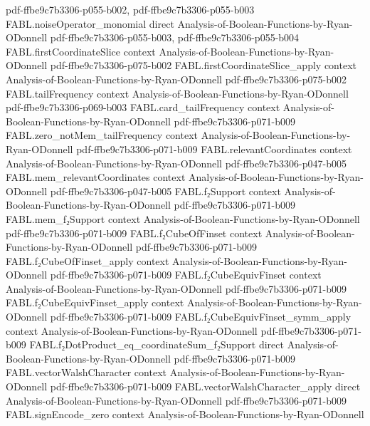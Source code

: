 \begin{theorem}
  {pdf-ffbe9c7b3306-p055-b002,
    pdf-ffbe9c7b3306-p055-b003}
\proofstep
  {FABL.noiseOperator_monomial}
  {direct}
  {Analysis-of-Boolean-Functions-by-Ryan-ODonnell}
  {pdf-ffbe9c7b3306-p055-b003,
    pdf-ffbe9c7b3306-p055-b004}
\proofstep
  {FABL.firstCoordinateSlice}
  {context}
  {Analysis-of-Boolean-Functions-by-Ryan-ODonnell}
  {pdf-ffbe9c7b3306-p075-b002}
\proofstep
  {FABL.firstCoordinateSlice_apply}
  {context}
  {Analysis-of-Boolean-Functions-by-Ryan-ODonnell}
  {pdf-ffbe9c7b3306-p075-b002}
\proofstep
  {FABL.tailFrequency}
  {context}
  {Analysis-of-Boolean-Functions-by-Ryan-ODonnell}
  {pdf-ffbe9c7b3306-p069-b003}
\proofstep
  {FABL.card_tailFrequency}
  {context}
  {Analysis-of-Boolean-Functions-by-Ryan-ODonnell}
  {pdf-ffbe9c7b3306-p071-b009}
\proofstep
  {FABL.zero_notMem_tailFrequency}
  {context}
  {Analysis-of-Boolean-Functions-by-Ryan-ODonnell}
  {pdf-ffbe9c7b3306-p071-b009}
\proofstep
  {FABL.relevantCoordinates}
  {context}
  {Analysis-of-Boolean-Functions-by-Ryan-ODonnell}
  {pdf-ffbe9c7b3306-p047-b005}
\proofstep
  {FABL.mem_relevantCoordinates}
  {context}
  {Analysis-of-Boolean-Functions-by-Ryan-ODonnell}
  {pdf-ffbe9c7b3306-p047-b005}
\proofstep
  {FABL.f₂Support}
  {context}
  {Analysis-of-Boolean-Functions-by-Ryan-ODonnell}
  {pdf-ffbe9c7b3306-p071-b009}
\proofstep
  {FABL.mem_f₂Support}
  {context}
  {Analysis-of-Boolean-Functions-by-Ryan-ODonnell}
  {pdf-ffbe9c7b3306-p071-b009}
\proofstep
  {FABL.f₂CubeOfFinset}
  {context}
  {Analysis-of-Boolean-Functions-by-Ryan-ODonnell}
  {pdf-ffbe9c7b3306-p071-b009}
\proofstep
  {FABL.f₂CubeOfFinset_apply}
  {context}
  {Analysis-of-Boolean-Functions-by-Ryan-ODonnell}
  {pdf-ffbe9c7b3306-p071-b009}
\proofstep
  {FABL.f₂CubeEquivFinset}
  {context}
  {Analysis-of-Boolean-Functions-by-Ryan-ODonnell}
  {pdf-ffbe9c7b3306-p071-b009}
\proofstep
  {FABL.f₂CubeEquivFinset_apply}
  {context}
  {Analysis-of-Boolean-Functions-by-Ryan-ODonnell}
  {pdf-ffbe9c7b3306-p071-b009}
\proofstep
  {FABL.f₂CubeEquivFinset_symm_apply}
  {context}
  {Analysis-of-Boolean-Functions-by-Ryan-ODonnell}
  {pdf-ffbe9c7b3306-p071-b009}
\proofstep
  {FABL.f₂DotProduct_eq_coordinateSum_f₂Support}
  {direct}
  {Analysis-of-Boolean-Functions-by-Ryan-ODonnell}
  {pdf-ffbe9c7b3306-p071-b009}
\proofstep
  {FABL.vectorWalshCharacter}
  {context}
  {Analysis-of-Boolean-Functions-by-Ryan-ODonnell}
  {pdf-ffbe9c7b3306-p071-b009}
\proofstep
  {FABL.vectorWalshCharacter_apply}
  {direct}
  {Analysis-of-Boolean-Functions-by-Ryan-ODonnell}
  {pdf-ffbe9c7b3306-p071-b009}
\proofstep
  {FABL.signEncode_zero}
  {context}
  {Analysis-of-Boolean-Functions-by-Ryan-ODonnell}

\end{theorem}
